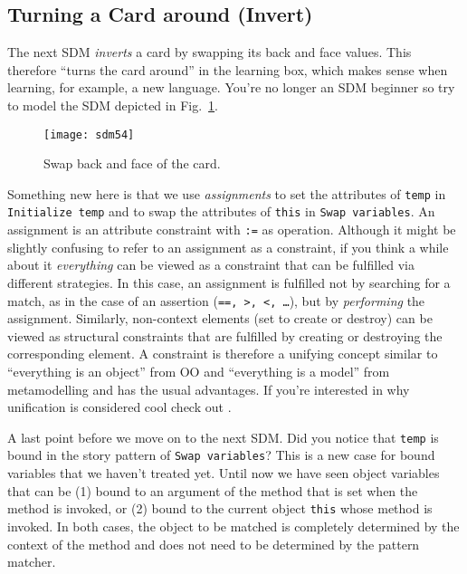 \newpage
\subsection{Turning a Card around (Invert)}

The next SDM \emph{inverts} a card by swapping its back and face values. This therefore ``turns the card around'' in the learning box, which makes sense when
learning, for example, a new language. You're no longer an SDM beginner so try to model the SDM depicted in Fig.~\ref{fig:sdm_invert}.

\begin{figure}[htbp]
\begin{center}
  \texttt{[image: sdm54]}
  \caption{Swap back and face of the card.}  
  \label{fig:sdm_invert}
\end{center}
\end{figure}

Something new here is that we use \emph{assignments} to set the attributes of \texttt{temp} in \texttt{Initialize temp} and to swap the
attributes of \texttt{this} in \texttt{Swap variables}. An assignment is an attribute constraint with \texttt{:=} as operation.  Although it might be slightly
confusing to refer to an assignment as a constraint, if you think a while about it \emph{everything} can be viewed as a constraint that can be fulfilled via
different strategies. In this case, an assignment is fulfilled not by searching  for a match, as in the case of an assertion (\texttt{==, >, <,
\ldots}), but by \emph{performing} the assignment. Similarly, non-context elements (set to create or destroy) can be viewed as structural constraints that are
fulfilled by creating or destroying the corresponding element.  A constraint is therefore a unifying concept similar to ``everything is an object'' from OO and
``everything is a model'' from metamodelling and has the usual advantages.  If  you're interested in why unification is considered cool check
out \cite{BEZ05}.

A last point before we move on to the next SDM.  Did you notice that \texttt{temp} is bound in the story pattern of \texttt{Swap variables}?  This is a new case
for bound variables that we haven't treated yet. Until now we have seen object variables that can be (1) bound to an argument of the method that is set when the
method is invoked, or (2) bound to the current object \texttt{this} whose method is invoked. In both cases, the object to be matched is completely determined by
the context of the method and does not need to be determined by the pattern matcher.

